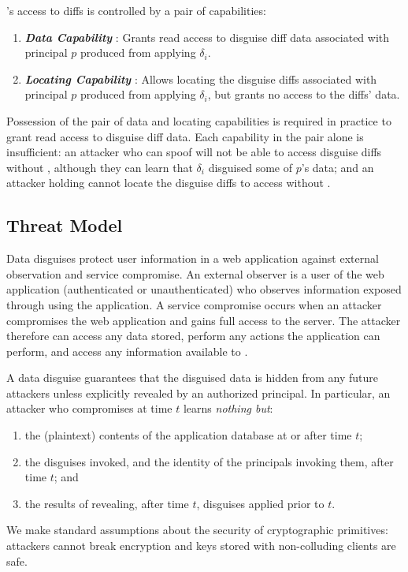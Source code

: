 \sys's access to diffs is controlled by a pair of capabilities: 
\begin{enumerate}
    \item \emph{\textbf{Data Capability }}: Grants read access to disguise diff data
        associated with principal $p$ produced from applying $\delta_i$.
    \item \emph{\textbf{Locating Capability }}: Allows locating the disguise
        diffs associated with principal $p$ produced from applying $\delta_i$, but grants no 
        access to the diffs' data.
\end{enumerate}

\noindent Possession of the pair of data and locating capabilities  is required in
practice to grant read access to disguise diff data.
Each capability in the pair alone is insufficient: an attacker who can spoof
 will not be able to access disguise diffs without
, although they can learn that $\delta_i$ disguised some of $p$'s data;
and an attacker holding  cannot locate the disguise diffs to access without
.

\subsection{Threat Model}
\label{s:threat}

%
Data disguises protect user information in a web application against external observation
and service compromise.
%
An external observer is a user of the web application (authenticated or unauthenticated) who
observes information exposed through using the application.
%
A service compromise occurs when an attacker compromises the web application and 
gains full access to the server.
%
The attacker therefore can access any data stored, perform any actions the application can
perform, and access any information available to \sys.
%

%
A data disguise guarantees that the disguised data is hidden from any future attackers unless
explicitly revealed by an authorized principal.
%
In particular, an attacker who compromises \sys at time $t$ learns \emph{nothing but}:
\begin{enumerate}[nosep]
  \item the (plaintext) contents of the application database at or after time $t$;
  \item the disguises invoked, and the identity of the principals invoking them, after time $t$; and
  \item the results of revealing, after time $t$, disguises applied prior to $t$.
\end{enumerate}
%
We make standard assumptions about the security of cryptographic primitives: attackers cannot
break encryption and keys stored with non-colluding clients are safe.
%

